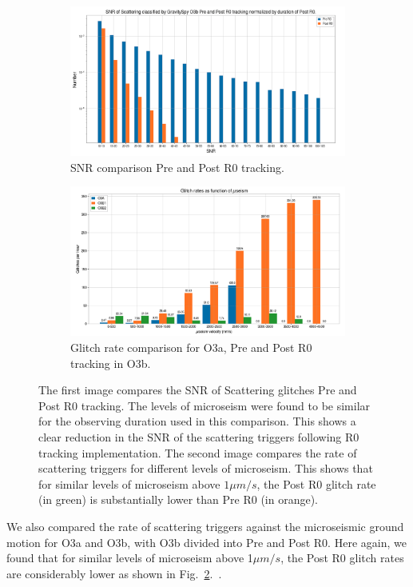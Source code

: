 \documentclass[12pt]{iopart}
\begin{document}
\begin{figure}[h]
   \centering
    \begin{subfigure}[b]{0.45\textwidth}
        \centering
         \includegraphics[width= \textwidth]{snr_r0.png}
         \caption{SNR comparison Pre and Post R0 tracking.}
         \label{fig:snr_r0}
    \end{subfigure}
    \hfill
    \begin{subfigure}[b]{0.45\textwidth}
        \centering
         \includegraphics[width =\textwidth]{rate_r0.png}
         \caption{Glitch rate comparison for O3a, Pre and Post R0 tracking in O3b.}
         \label{fig:rate_r0}
         
    
    \end{subfigure}
    \caption{The first image compares the SNR of Scattering glitches Pre and Post R0 tracking. The levels of microseism were found to be similar for the observing duration used in this comparison. This shows a clear reduction in the SNR of the scattering triggers following R0 tracking implementation. The second image compares the rate of scattering triggers for different levels of microseism. This shows that for similar levels of microseism above $1{\mu}m/s$, the Post R0 glitch rate (in green) is substantially lower than Pre R0 (in orange).}
    \label{fig:postr0_scat}
    
\end{figure}
We also compared the rate of scattering triggers against the microseismic ground motion for O3a and O3b, with O3b divided into Pre and Post R0. Here again, we found that for similar levels of microseism above 1${\mu}m/s$, the Post R0 glitch rates are considerably lower as shown in Fig.~\ref{fig:rate_r0}.~\cite{alog_corey}.
\end{document}
